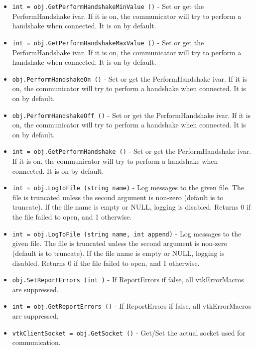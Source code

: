 \begin{itemize}
\item  \verb|int = obj.GetPerformHandshakeMinValue ()| -  Set or get the PerformHandshake ivar. If it is on, the communicator
 will try to perform a handshake when connected.
 It is on by default.

\item  \verb|int = obj.GetPerformHandshakeMaxValue ()| -  Set or get the PerformHandshake ivar. If it is on, the communicator
 will try to perform a handshake when connected.
 It is on by default.

\item  \verb|obj.PerformHandshakeOn ()| -  Set or get the PerformHandshake ivar. If it is on, the communicator
 will try to perform a handshake when connected.
 It is on by default.

\item  \verb|obj.PerformHandshakeOff ()| -  Set or get the PerformHandshake ivar. If it is on, the communicator
 will try to perform a handshake when connected.
 It is on by default.

\item  \verb|int = obj.GetPerformHandshake ()| -  Set or get the PerformHandshake ivar. If it is on, the communicator
 will try to perform a handshake when connected.
 It is on by default.

\item  \verb|int = obj.LogToFile (string name)| -  Log messages to the given file.  The file is truncated unless the
 second argument is non-zero (default is to truncate).  If the
 file name is empty or NULL, logging is disabled.  Returns 0 if
 the file failed to open, and 1 otherwise.

\item  \verb|int = obj.LogToFile (string name, int append)| -  Log messages to the given file.  The file is truncated unless the
 second argument is non-zero (default is to truncate).  If the
 file name is empty or NULL, logging is disabled.  Returns 0 if
 the file failed to open, and 1 otherwise.

\item  \verb|obj.SetReportErrors (int )| -  If ReportErrors if false, all vtkErrorMacros are suppressed.

\item  \verb|int = obj.GetReportErrors ()| -  If ReportErrors if false, all vtkErrorMacros are suppressed.

\item  \verb|vtkClientSocket = obj.GetSocket ()| -  Get/Set the actual socket used for communication.


\end{itemize}
